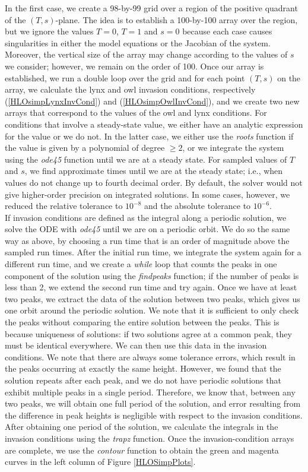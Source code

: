 \documentclass[12pt]{UOthesis}
\theoremstyle{remarkstyle}
\begin{document}
In the first case, we create a 98-by-99 grid over a region of the positive quadrant of the $(T,s)$-plane. The idea is to establish a 100-by-100 array over the region, but we ignore the values $T=0$, $T=1$ and $s=0$ because each case causes singularities in either the model equations or the Jacobian of the system. Moreover, the vertical size of the array may change according to the values of $s$ we consider; however, we remain on the order of 100. Once our array is established, we run a double loop over the grid and for each point $(T,s)$ on the array, we calculate the lynx and owl invasion conditions, respectively (\ref{HLOsimpLynxInvCond}) and (\ref{HLOsimpOwlInvCond}), and we create two new arrays that correspond to the values of the owl and lynx conditions. For conditions that involve a steady-state value, we either have an analytic expression for the value or we do not. In the latter case, we either use the \textit{roots} function if the value is given by a polynomial of degree $\ge 2$, or we integrate the system using the \textit{ode45} function until we are at a steady state. For sampled values of $T$ and $s$, we find approximate times until we are at the steady state; i.e., when values do not change up to fourth decimal order. By default, the solver would not give higher-order precision on integrated solutions. In some cases, however, we reduced the relative tolerance to $10^{-8}$ and the absolute tolerance to $10^{-6}$.\\

If invasion conditions are defined as the integral along a periodic solution, we solve the ODE with \textit{ode45} until we are on a periodic orbit. We do so the same way as above, by choosing a run time that is an order of magnitude above the sampled run times. After the initial run time, we integrate the system again for a different run time, and we create a \textit{while} loop that counts the peaks in one component of the solution using the \textit{findpeaks} function; if the number of peaks is less than 2, we extend the second run time and try again. Once we have at least two peaks, we extract the data of the solution between two peaks, which gives us one orbit around the periodic solution. We note that it is sufficient to only check the peaks without comparing the entire solution between the peaks. This is because uniqueness of solutions: if two solutions agree at a common peak, they must be identical everywhere. We can then use this data in the invasion conditions. We note that there are always some tolerance errors, which result in the peaks occurring at exactly the same height. However, we found that the solution repeats after each peak, and we do not have periodic solutions that exhibit multiple peaks in a single period. Therefore, we know that, between any two peaks, we will obtain one full period of the solution, and error resulting from the difference in peak heights is negligible with respect to the invasion conditions. After obtaining one period of the solution, we calculate the integrals in the invasion conditions using the \textit{trapz} function. Once the invasion-condition arrays are complete, we use the \textit{contour} function to obtain the green and magenta curves in the left column of Figure \ref{HLOSimpPlots}.\\
\end{document}
